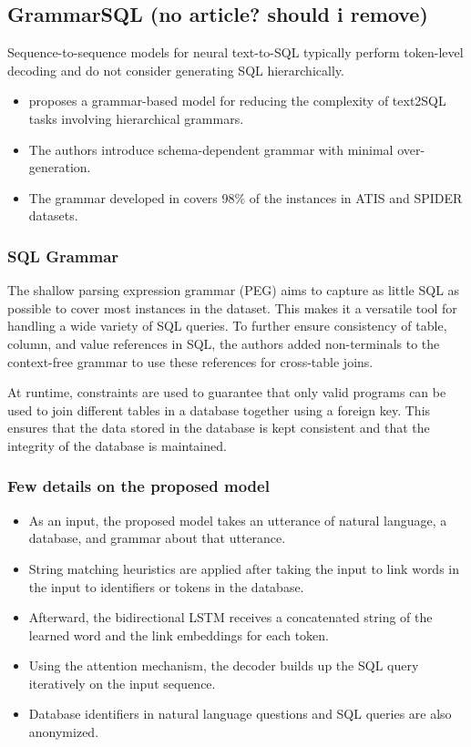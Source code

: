 \subsection{GrammarSQL (no article? should i remove)}

Sequence-to-sequence models for neural text-to-SQL typically perform token-level decoding and do not consider generating SQL hierarchically.

\begin{itemize}
    \item \cite{xu_sqlnet_2017} proposes a grammar-based model for reducing the complexity of text2SQL tasks involving hierarchical grammars.
    \item The authors introduce schema-dependent grammar with minimal over-generation.
    \item The grammar developed in \cite{xu_sqlnet_2017} covers 98\% of the instances in ATIS and SPIDER datasets.
\end{itemize}

\subsubsection{SQL Grammar}

The shallow parsing expression grammar (PEG) aims to capture as little SQL as possible to cover most instances in the dataset. This makes it a versatile tool for handling a wide variety of SQL queries. To further ensure consistency of table, column, and value references in SQL, the authors added non-terminals to the context-free grammar to use these references for cross-table joins.

At runtime, constraints are used to guarantee that only valid programs can be used to join different tables in a database together using a foreign key. This ensures that the data stored in the database is kept consistent and that the integrity of the database is maintained.

\subsubsection{Few details on the proposed model}

\begin{itemize}
    \item As an input, the proposed model takes an utterance of natural language, a database, and grammar about that utterance.
    \item String matching heuristics are applied after taking the input to link words in the input to identifiers or tokens in the database.
    \item Afterward, the bidirectional LSTM receives a concatenated string of the learned word and the link embeddings for each token.
    \item Using the attention mechanism, the decoder builds up the SQL query iteratively on the input sequence.
    \item Database identifiers in natural language questions and SQL queries are also anonymized.
\end{itemize}


